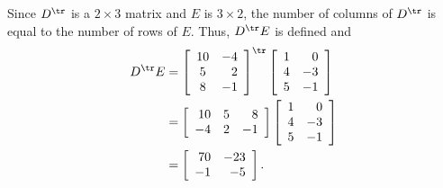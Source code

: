 \begin{example}
\item Since $D^{\tr}$ is a $2 \times 3$ matrix and $E$ is $3 \times 2$, the number of columns of $D^{\tr}$ is equal to the number of rows of $E$. Thus, $D^{\tr}E$ is defined and 
\begin{align*}
D^{\tr}E &= \left[ \begin{array}{cr} 10&-4\\5&2\\8&-1 \end{array} \right]^{\tr} 
 \left[ \begin{array}{cr} 1&0\\4&-3\\5&-1 \end{array} \right] \\
	&= \left[ \begin{array}{rcr} 10&5&8\\ -4&2&-1 \end{array} \right] \left[ \begin{array}{cr} 1&0\\4&-3\\5&-1 \end{array} \right] \\
	&= \left[ \begin{array}{rr} 70&-23 \\ -1&-5 \end{array} \right].
\end{align*}




\end{example}

